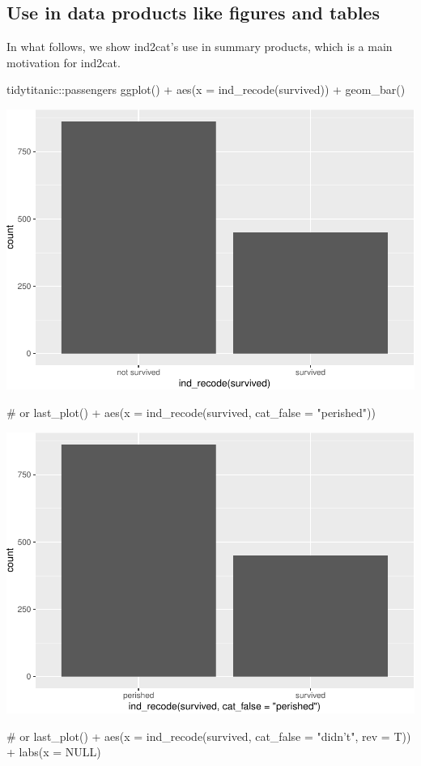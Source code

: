 \hypertarget{use-in-data-products-like-figures-and-tables}{%
\subsection{Use in data products like figures and
tables}\label{use-in-data-products-like-figures-and-tables}}

In what follows, we show ind2cat's use in summary products, which is a
main motivation for ind2cat.

\begin{Schunk}
\begin{Sinput}
tidytitanic::passengers %
ggplot() + 
  aes(x = ind_recode(survived)) + 
  geom_bar()
\end{Sinput}

\includegraphics[width=0.69\linewidth]{r_journal_files/figure-latex/unnamed-chunk-9-1} \begin{Sinput}
# or
last_plot() +
  aes(x = ind_recode(survived, cat_false = "perished"))
\end{Sinput}

\includegraphics[width=0.69\linewidth]{r_journal_files/figure-latex/unnamed-chunk-9-2} \begin{Sinput}
# or
last_plot() +
  aes(x = ind_recode(survived, cat_false = "didn't", rev = T)) + 
  labs(x = NULL)
\end{Sinput}


\end{Schunk}
